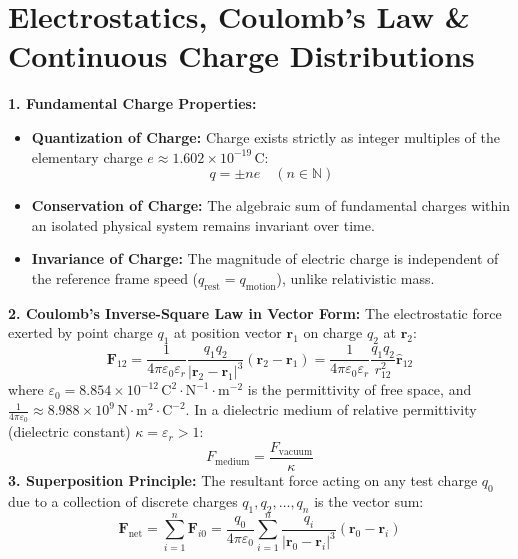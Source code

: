 \documentclass[10pt,twoside,openright]{book}
\begin{document}
\section{Electrostatics, Coulomb's Law \& Continuous Charge Distributions}

\begin{conceptbox}
\textbf{1. Fundamental Charge Properties:}
\begin{itemize}
  \item \textbf{Quantization of Charge:} Charge exists strictly as integer multiples of the elementary charge $e \approx 1.602 \times 10^{-19}\,\mathrm{C}$:
  \begin{equation}
    q = \pm n e \quad (n \in \mathbb{N})
  \end{equation}
  \item \textbf{Conservation of Charge:} The algebraic sum of fundamental charges within an isolated physical system remains invariant over time.
  \item \textbf{Invariance of Charge:} The magnitude of electric charge is independent of the reference frame speed ($q_{\text{rest}} = q_{\text{motion}}$), unlike relativistic mass.
\end{itemize}
\textbf{2. Coulomb's Inverse-Square Law in Vector Form:}
The electrostatic force exerted by point charge $q_1$ at position vector $\mathbf{r}_1$ on charge $q_2$ at $\mathbf{r}_2$:
\begin{equation}
  \mathbf{F}_{12} = \frac{1}{4\pi\varepsilon_0 \varepsilon_r} \frac{q_1 q_2}{|\mathbf{r}_2 - \mathbf{r}_1|^3} (\mathbf{r}_2 - \mathbf{r}_1) = \frac{1}{4\pi\varepsilon_0 \varepsilon_r} \frac{q_1 q_2}{r_{12}^2} \hat{\mathbf{r}}_{12}
\end{equation}
where $\varepsilon_0 = 8.854 \times 10^{-12}\,\mathrm{C}^2\cdot\mathrm{N}^{-1}\cdot\mathrm{m}^{-2}$ is the permittivity of free space, and $\frac{1}{4\pi\varepsilon_0} \approx 8.988 \times 10^9\,\mathrm{N}\cdot\mathrm{m}^2\cdot\mathrm{C}^{-2}$.
In a dielectric medium of relative permittivity (dielectric constant) $\kappa = \varepsilon_r > 1$:
\begin{equation}
  F_{\text{medium}} = \frac{F_{\text{vacuum}}}{\kappa}
\end{equation}
\textbf{3. Superposition Principle:}
The resultant force acting on any test charge $q_0$ due to a collection of discrete charges $q_1, q_2, \dots, q_n$ is the vector sum:
\begin{equation}
  \mathbf{F}_{\text{net}} = \sum_{i=1}^n \mathbf{F}_{i0} = \frac{q_0}{4\pi\varepsilon_0} \sum_{i=1}^n \frac{q_i}{|\mathbf{r}_0 - \mathbf{r}_i|^3} (\mathbf{r}_0 - \mathbf{r}_i)
\end{equation}
\end{conceptbox}
\end{document}

